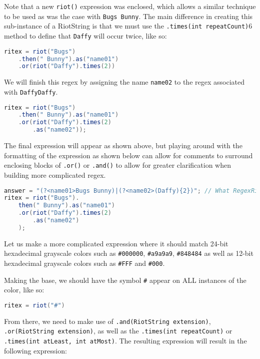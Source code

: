 \documentclass[conference]{IEEEtran}
\begin{document}
Note that a new \texttt{riot()} expression was enclosed, which allows a similar
technique to be used as was the case with \texttt{Bugs Bunny}. The main
difference in creating this sub-instance of a RiotString is that we must
use the \texttt{.times(int repeatCount)}6 method to define that \texttt{Daffy} will
occur twice, like so:

\begin{lstlisting}[language=Java]
ritex = riot("Bugs")
    .then(" Bunny").as("name01")
    .or(riot("Daffy").times(2))
\end{lstlisting}

We will finish this regex by assigning the name \texttt{name02}
to the regex associated with \texttt{DaffyDaffy}.

\begin{lstlisting}[language=Java]
ritex = riot("Bugs")
    .then(" Bunny").as("name01")
    .or(riot("Daffy").times(2)
        .as("name02"));
\end{lstlisting}

The final expression will appear as shown above, but playing around with
the formatting of the expression as shown below can allow for comments
to surround enclosing blocks of \texttt{.or()} or \texttt{.and()} to allow for
greater clarification when building more complicated regex.

\begin{lstlisting}[language=Java]
answer = "(?<name01>Bugs Bunny)|(?<name02>(Daffy){2})"; // What RegexRiot would generate
ritex = riot("Bugs").
    then(" Bunny").as("name01")
    .or(riot("Daffy").times(2)
        .as("name02")
    );
\end{lstlisting}

Let us make a more complicated expression where it should match 24-bit
hexadecimal grayscale colors such as \texttt{\#000000}, \texttt{\#a9a9a9},
\texttt{\#848484} as well as 12-bit hexadecimal grayscale colors such as
\texttt{\#FFF} and \texttt{\#000}.

Making the base, we should have the symbol \texttt{\#} appear on ALL instances
of the color, like so:

\begin{lstlisting}[language=Java]
ritex = riot("#")
\end{lstlisting}

From there, we need to make use of \texttt{.and(RiotString extension)},
\texttt{.or(RiotString extension)}, as well as the
\texttt{.times(int repeatCount)} or \texttt{.times(int atLeast, int atMost)}.
The resulting expression will result in the following expression:
\end{document}
